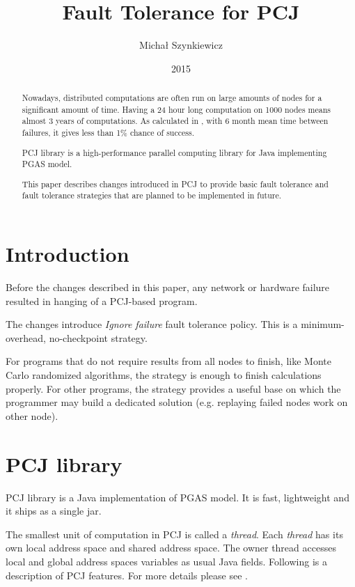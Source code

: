 \documentclass{llncs}
\begin{document}
\title{Fault Tolerance for PCJ}

\author{Michał Szynkiewicz}

\date{2015}
\maketitle

\begin{abstract}

Nowadays, distributed computations are often run on large amounts of nodes for a significant amount of time.
Having a 24 hour long computation on 1000 nodes means almost 3 years of computations.
As calculated in \cite{rx10}, with 6 month mean time between failures, it gives less than 1\% chance of success.

PCJ library is a high-performance parallel computing library for Java implementing PGAS model.

This paper describes changes introduced in PCJ to provide basic fault tolerance and fault tolerance strategies that are planned to be implemented in future.

\end{abstract}

\section{Introduction}
Before the changes described in this paper, any network or hardware failure resulted in hanging of a PCJ-based program.

The changes introduce \emph{Ignore failure} fault tolerance policy.
This is a minimum-overhead, no-checkpoint strategy.

For programs that do not require results from all nodes to finish, like Monte Carlo randomized algorithms, the strategy is enough to finish calculations properly.
For other programs, the strategy provides a useful base on which the programmer may build a dedicated solution (e.g. replaying failed nodes work on other node).


\section{PCJ library}
PCJ library is a Java implementation of PGAS model.
It is fast, lightweight and it ships as a single jar.


The smallest unit of computation in PCJ is called a \emph{thread}. Each \emph{thread} has its own local address space and shared address space.
The owner thread accesses local and global address spaces variables as usual Java fields.
Following is a description of PCJ features. For more details please see \cite{pcj-manual}.
\end{document}
